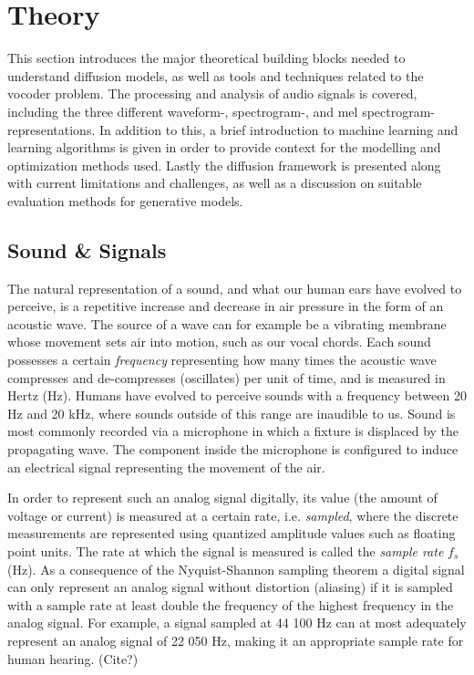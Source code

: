 \documentclass{article}
\begin{document}
\section{Theory}

This section introduces the major theoretical building blocks needed to understand diffusion models, as well as tools and techniques related to the vocoder problem. The processing and analysis of audio signals is covered, including the three different waveform-, spectrogram-, and mel spectrogram-representations. In addition to this, a brief introduction to machine learning and learning algorithms is given in order to provide context for the modelling and optimization methods used. Lastly the diffusion framework is presented along with current limitations and challenges, as well as a discussion on suitable evaluation methods for generative models.

\subsection{Sound \& Signals} \label{sec:sounds}

The natural representation of a sound, and what our human ears have evolved to perceive, is a repetitive increase and decrease in air pressure in the form of an acoustic wave. The source of a wave can for example be a vibrating membrane whose movement sets air into motion, such as our vocal chords. Each sound possesses a certain \textit{frequency} representing how many times the acoustic wave compresses and de-compresses (oscillates) per unit of time, and is measured in Hertz (Hz). Humans have evolved to perceive sounds with a frequency between 20 Hz and 20 kHz, where sounds outside of this range are inaudible to us. Sound is most commonly recorded via a microphone in which a fixture is displaced by the propagating wave. The component inside the microphone is configured to induce an electrical signal representing the movement of the air.

In order to represent such an analog signal digitally, its value (the amount of voltage or current) is measured at a certain rate, i.e. \textit{sampled}, where the discrete measurements are represented using quantized amplitude values such as floating point units. The rate at which the signal is measured is called the \textit{sample rate} $f_s$ (Hz). As a consequence of the Nyquist-Shannon sampling theorem a digital signal can only represent an analog signal without distortion (aliasing) if it is sampled with a sample rate at least double the frequency of the highest frequency in the analog signal. For example, a signal sampled at 44 100 Hz can at most adequately represent an analog signal of 22 050 Hz, making it an appropriate sample rate for human hearing. (Cite?)
\end{document}

